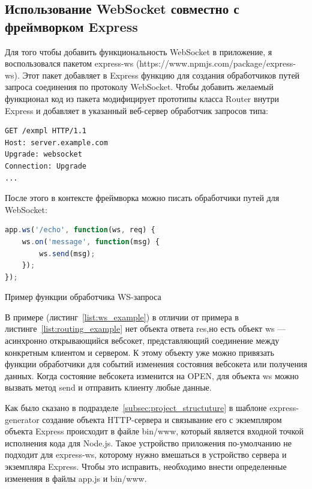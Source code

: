 \subsection{Использование WebSocket совместно с фреймворком Express}
Для того чтобы добавить функциональность WebSocket в приложение, я воспользовался пакетом express-ws (https://www.npmjs.com/package/express-ws). Этот пакет добавляет в Express функцию для создания обработчиков путей запроса соединения по протоколу WebSocket. Чтобы добавить желаемый функционал код из пакета модифицирует прототипы класса Router внутри Express и добавляет в указанный веб-сервер обработчик запросов типа:
\begin{lstlisting}[language]
GET /exmpl HTTP/1.1
Host: server.example.com
Upgrade: websocket
Connection: Upgrade
...
\end{lstlisting}
После этого в контексте фреймворка можно писать обработчики путей для WebSocket:
\begin{ListingEnv}[H]
	\begin{lstlisting}[language=JavaScript]
app.ws('/echo', function(ws, req) {
	ws.on('message', function(msg) {
		ws.send(msg);
	});
});
	\end{lstlisting}
	\caption{Пример функции обработчика WS-запроса}
	\label{list:ws_example}
\end{ListingEnv}
В примере (листинг~\ref{list:ws_example}) в отличии от примера в листинге~\ref{list:routing_example} нет объекта ответа res,но есть объект ws --- асинхронно открывающийся вебсокет, представляющий соединение между конкретным клиентом и сервером. К этому объекту уже можно привязать функции обработчики для событий изменения состояния вебсокета или получения данных. Когда состояние вебсокета изменится на OPEN, для объекта ws можно вызвать метод send и отправить клиенту любые данные.   

Как было сказано в подразделе~\ref{subsec:project_structuture} в шаблоне express-generator создание объекта HTTP-сервера и связывание его с экземпляром объекта Express происходит в файле bin/www, который является входной точкой исполнения кода для Node.js. Такое устройство приложения по-умолчанию не подходит для express-ws, которому нужно вмешаться в устройство сервера и экземпляра Express. Чтобы это исправить, необходимо внести определенные изменения в файлы app.js и bin/www.

